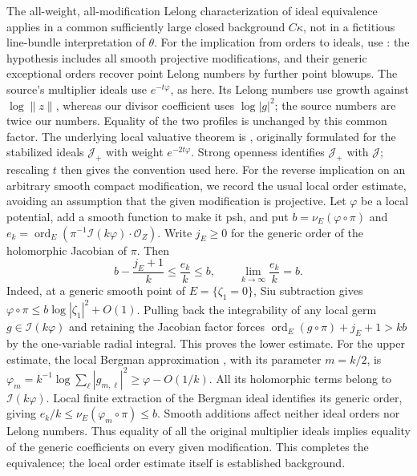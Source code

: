 \documentclass[11pt]{article}
\theoremstyle{remark}\newtheorem{remark}[theorem]{Remark}
\begin{document}
The all-weight, all-modification Lelong characterization of ideal
equivalence applies in a common sufficiently large closed background
$C\kappa$, not in a fictitious line-bundle interpretation of $\theta$.
For the implication from orders to ideals, use
\cite[Theorem 2.13 and Proposition 2.30]{DX}: the hypothesis includes
all smooth projective modifications, and their generic exceptional orders
recover point Lelong numbers by further point blowups. The source's
multiplier ideals use $e^{-t\varphi}$, as here.
Its Lelong numbers use growth against $\log\|z\|$, whereas our divisor
coefficient uses $\log|g|^2$; the source numbers are twice our numbers.
Equality of the two profiles is unchanged by this common factor.
The underlying local valuative theorem is \cite[Theorem A]{BFJ},
originally formulated for the stabilized ideals $\mathcal J_+$
with weight $e^{-2t\varphi}$. Strong openness
\cite[Theorem 1.1]{GZ} identifies $\mathcal J_+$ with $\mathcal J$;
rescaling $t$ then gives the convention used here.
For the reverse implication on an arbitrary smooth compact modification,
we record the usual local order estimate, avoiding an assumption that the
given modification is projective. Let $\varphi$ be a local potential, add
a smooth function to make it psh, and put
$b=\nu_E(\varphi\circ\pi)$ and
$e_k=\operatorname{ord}_E(\pi^{-1}\mathcal I(k\varphi)\cdot\mathcal O_Z)$.
Write $j_E\geq0$ for the generic order of the holomorphic Jacobian of
$\pi$. Then
\begin{equation}\label{eq:valuation-limit}
 b-\frac{j_E+1}{k}\leq\frac{e_k}{k}\leq b,
 \qquad\lim_{k\to\infty}\frac{e_k}{k}=b.
\end{equation}
Indeed, at a generic smooth point of $E=\{\zeta_1=0\}$, Siu subtraction
gives $\varphi\circ\pi\leq b\log|\zeta_1|^2+O(1)$.
Pulling back the integrability of any local germ $g\in\mathcal I(k\varphi)$
and retaining the Jacobian factor forces
$\operatorname{ord}_E(g\circ\pi)+j_E+1>kb$ by the one-variable radial
integral. This proves the lower estimate. For the upper estimate, the
local Bergman approximation \cite[Theorem 1.2]{DemB}, with its parameter
$m=k/2$, is
$\varphi_m=k^{-1}\log\sum_\ell|g_{m,\ell}|^2\geq\varphi-O(1/k)$.
All its holomorphic terms belong to $\mathcal I(k\varphi)$.
Local finite extraction of the Bergman ideal identifies its generic
order, giving
$e_k/k\leq\nu_E(\varphi_m\circ\pi)\leq b$.
Smooth additions affect neither ideal orders nor Lelong numbers.
Thus equality of all the original multiplier ideals implies equality of
the generic coefficients on every given modification. This completes
the equivalence; the local order estimate itself is established background.
\end{document}
